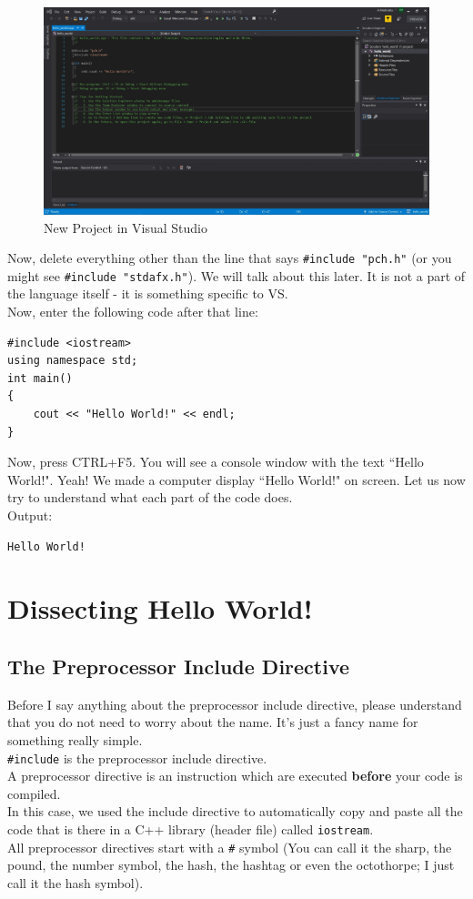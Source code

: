 \documentclass[letterpaper, 12pt]{book}
\begin{document}
\begin{figure}[h]
\centering
\includegraphics[scale=0.4]{img/vs}
\caption{New Project in Visual Studio}\label{vs}
\end{figure}
Now, delete everything other than the line that says \lstinline{#include "pch.h"} (or you might see \lstinline{#include "stdafx.h"}). We will talk about this later. It is not a part of the language itself - it is something specific to VS.\\
Now, enter the following code after that line:
\begin{lstlisting}
#include <iostream>
using namespace std;
int main()
{
	cout << "Hello World!" << endl;
}	
\end{lstlisting}
Now, press CTRL+F5. You will see a console window with the text ``Hello World!". Yeah! We made a computer display ``Hello World!" on screen. Let us now try to understand what each part of the code does.\\
Output:\\
\begin{lstlisting}
Hello World!
\end{lstlisting}
\section{Dissecting Hello World!}
\subsection*{The Preprocessor Include Directive}
Before I say anything about the preprocessor include directive, please understand that you do not need to worry about the name. It's just a fancy name for something really simple.\\
\lstinline{#include} is the preprocessor include directive.\\
A preprocessor directive is an instruction which are executed \textbf{before} your code is compiled.\\
In this case, we used the include directive to automatically copy and paste all the code that is there in a C++ library (header file) called \lstinline{iostream}.\\
All preprocessor directives start with a \lstinline{#} symbol (You can call it the sharp, the pound, the number symbol, the hash, the hashtag or even the octothorpe; I just call it the hash symbol).
\end{document}
